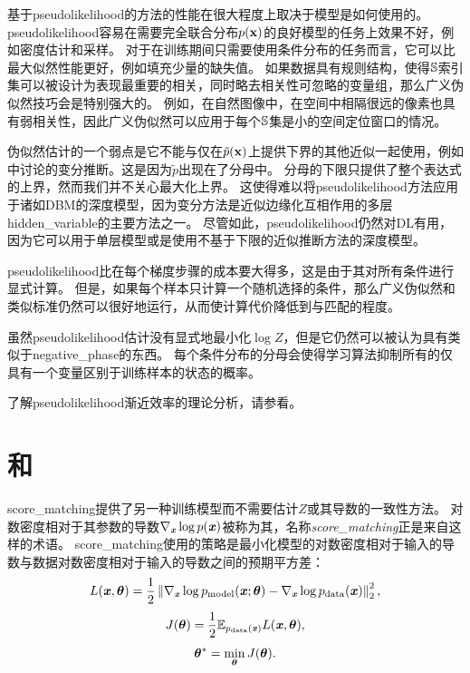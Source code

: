 基于\gls{pseudolikelihood}的方法的性能在很大程度上取决于模型是如何使用的。
\gls{pseudolikelihood}容易在需要完全联合分布$p(\mathbf{x})$的良好模型的任务上效果不好，例如密度估计和采样。
对于在训练期间只需要使用条件分布的任务而言，它可以比最大似然性能更好，例如填充少量的缺失值。
如果数据具有规则结构，使得$\mathbb{S}$索引集可以被设计为表现最重要的相关，同时略去相关性可忽略的变量组，那么广义伪似然技巧会是特别强大的。
例如，在自然图像中，在空间中相隔很远的像素也具有弱相关性，因此广义伪似然可以应用于每个$\mathbb{S}$集是小的空间定位窗口的情况。


伪似然估计的一个弱点是它不能与仅在$\tilde{p}(\mathbf{x})$上提供下界的其他近似一起使用，例如中讨论的变分推断。这是因为$\tilde{p}$出现在了分母中。
分母的下限只提供了整个表达式的上界，然而我们并不关心最大化上界。
这使得难以将\gls{pseudolikelihood}方法应用于诸如\gls{DBM}的深度模型，因为变分方法是近似边缘化互相作用的多层\gls{hidden_variable}的主要方法之一。
尽管如此，\gls{pseudolikelihood}仍然对\gls{DL}有用，因为它可以用于单层模型或是使用不基于下限的近似推断方法的深度模型。


\gls{pseudolikelihood}比在每个梯度步骤的成本要大得多，这是由于其对所有条件进行显式计算。
但是，如果每个样本只计算一个随机选择的条件，那么广义伪似然和类似标准仍然可以很好地运行，从而使计算代价降低到与匹配的程度\citep{Goodfellow-et-al-NIPS2013}。


虽然\gls{pseudolikelihood}估计没有显式地最小化$\log Z$，但是它仍然可以被认为具有类似于\gls{negative_phase}的东西。
每个条件分布的分母会使得学习算法抑制所有的仅具有一个变量区别于训练样本的状态的概率。


了解\gls{pseudolikelihood}渐近效率的理论分析，请参看\cite{Marlin11-small}。


\section{和}
\label{sec:score_matching_and_ratio_matching}
\gls{score_matching}\citep{Hyvarinen-2005-small}提供了另一种训练模型而不需要估计$Z$或其导数的一致性方法。
对数密度相对于其参数的导数$\nabla_{\boldsymbol{\mathit{x}}} \log p(\boldsymbol{\mathit{x}})$被称为其，名称\emph{\gls{score_matching}}正是来自这样的术语。
\gls{score_matching}使用的策略是最小化模型的对数密度相对于输入的导数与数据对数密度相对于输入的导数之间的预期平方差：
\begin{equation}
	L(\boldsymbol{\mathit{x}}, \boldsymbol{\theta}) = \frac{1}{2} \left\lVert  \nabla_{\boldsymbol{\mathit{x}}} \log p_{\text{model}}(\boldsymbol{\mathit{x}}; \boldsymbol{\theta}) - \nabla_{\boldsymbol{\mathit{x}}} \log p_{\text{data}} (\boldsymbol{\mathit{x}})  \right\rVert_2^2,
\end{equation}
\begin{equation}
	J(\boldsymbol{\theta}) = \frac{1}{2} \mathbb{E}_{p_{\text{data}}(\boldsymbol{\mathit{x}})}  L(\boldsymbol{\mathit{x}}, \boldsymbol{\theta}),
\end{equation}
\begin{equation}
	\boldsymbol{\theta}^* = \min_{\boldsymbol{\theta}} J(\boldsymbol{\theta}) .
\end{equation}


